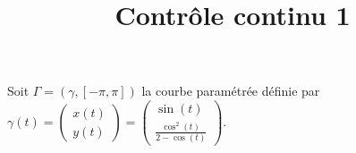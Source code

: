 \documentclass[a4paper]{tp_um}
\title{\large \sffamily\bfseries Contrôle continu 1}
\begin{document}
\maketitle

\bigskip
\bigskip


\exo{}Soit $\Gamma=(\gamma, [-\pi,\pi])$ la courbe paramétrée définie par $\gamma(t)= \begin{pmatrix}x(t) \\ y(t) \end{pmatrix} = \begin{pmatrix}\sin(t) \\ \frac{\cos^2(t)}{2 - \cos(t)} \end{pmatrix}$.
\end{document}
